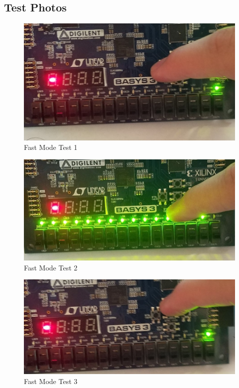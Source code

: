 \documentclass[11pt]{article}
\begin{document}
\subsection{Test Photos}

\begin{figure}[ht]\centering
	\includegraphics[width=1.0\textwidth,trim=0 0mm 0 0,clip]{Fast1}
	\caption{Fast Mode Test 1}
\end{figure}
\begin{figure}[ht]\centering
\includegraphics[width=1.0\textwidth,trim=0 0mm 0 0,clip]{Fast2}
\caption{Fast Mode Test 2}
\end{figure}
\begin{figure}[ht]\centering
\includegraphics[width=1.0\textwidth,trim=0 0mm 0 0,clip]{Fast3}
\caption{Fast Mode Test 3}
\end{figure}
\end{document}
